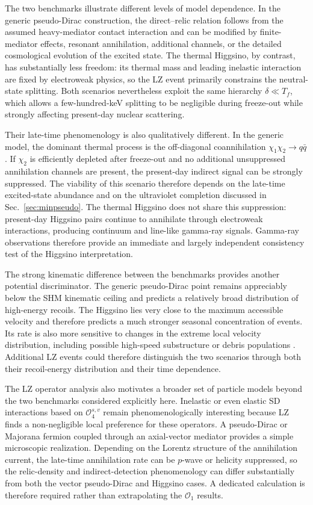 \documentclass[aps,prd,reprint,superscriptaddress,nofootinbib,longbibliography,floatfix]{revtex4-2}
\begin{document}
The two benchmarks illustrate different levels of model dependence. In the generic pseudo-Dirac construction, the direct--relic relation follows from the assumed heavy-mediator contact interaction and can be modified by finite-mediator effects, resonant annihilation, additional channels, or the detailed cosmological evolution of the excited state. The thermal Higgsino, by contrast, has substantially less freedom: its thermal mass and leading inelastic interaction are fixed by electroweak physics, so the LZ event primarily constrains the neutral-state splitting. Both scenarios nevertheless exploit the same hierarchy $\delta\ll T_f$, which allows a few-hundred-keV splitting to be negligible during freeze-out while strongly affecting present-day nuclear scattering.

Their late-time phenomenology is also qualitatively different. In the generic model, the dominant thermal process is the off-diagonal coannihilation $\chi_1\chi_2\to q\bar q$. If $\chi_2$ is efficiently depleted after freeze-out and no additional unsuppressed annihilation channels are present, the present-day indirect signal can be strongly suppressed. The viability of this scenario therefore depends on the late-time excited-state abundance and on the ultraviolet completion discussed in Sec.~\ref{sec:minpseudo}. The thermal Higgsino does not share this suppression: present-day Higgsino pairs continue to annihilate through electroweak interactions, producing continuum and line-like gamma-ray signals. Gamma-ray observations therefore provide an immediate and largely independent consistency test of the Higgsino interpretation.

The strong kinematic difference between the benchmarks provides another potential discriminator. The generic pseudo-Dirac point remains appreciably below the SHM kinematic ceiling and predicts a relatively broad distribution of high-energy recoils. The Higgsino lies very close to the maximum accessible velocity and therefore predicts a much stronger seasonal concentration of events. Its rate is also more sensitive to changes in the extreme local velocity distribution, including possible high-speed substructure or debris populations \cite{Graham2025}. Additional LZ events could therefore distinguish the two scenarios through both their recoil-energy distribution and their time dependence.

The LZ operator analysis also motivates a broader set of particle models beyond the two benchmarks considered explicitly here. Inelastic or even elastic SD interactions based on $\mathcal{O}_4^{s,v}$ remain phenomenologically interesting because LZ finds a non-negligible local preference for these operators. A pseudo-Dirac or Majorana fermion coupled through an axial-vector mediator provides a simple microscopic realization. Depending on the Lorentz structure of the annihilation current, the late-time annihilation rate can be $p$-wave or helicity suppressed, so the relic-density and indirect-detection phenomenology can differ substantially from both the vector pseudo-Dirac and Higgsino cases. A dedicated calculation is therefore required rather than extrapolating the $\mathcal{O}_1$ results.
\end{document}
